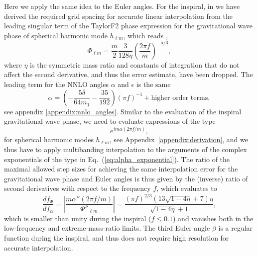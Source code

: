 \documentclass[%
aps,
prd,
amssymb,
amsmath,
amsfonts,
eqsecnum,
showpacs,
nofootinbib,
floatfix,
twocolumn,
twoside,
a4paper,
superscriptaddress
]{revtex4-1}
\begin{document}
Here we apply the same idea to the Euler angles. For the inspiral, in \cite{Garcia-Quiros:2020qlt} we have derived the required grid spacing for accurate linear interpolation from  
the leading singular term of the TaylorF2 phase expression for the gravitational wave phase of spherical harmonic mode $h_{\ell m}$, which reads
\cite{Buonanno:2009zt},
\begin{equation}
\Phi_{\ell m} = \frac{m}{2} \frac{3}{128 \eta} \left(\frac{2\pi f}{m}\right)^{-5/3},
\end{equation}
where $\eta$  is the symmetric mass ratio and constants of integration that do not affect the second derivative, and thus the error estimate, have been dropped. 
The leading term for the NNLO angles $\alpha$ and $\epsilon$ is the same
\begin{equation}
    \alpha  = \left(-\frac{5 \delta }{64 m_1}-\frac{35}{192}\right) (\pi f)^{-1} + \mbox{higher order terms},
\end{equation}
see appendix \ref{appendix:nnlo_angles}.
Similar to the evaluation of the inspiral gravitational wave phase, we need to 
evaluate expressions of the type
\begin{equation}\label{eq:alpha_exponential}
e^{i m \alpha(2\pi f/m)},
\end{equation}
for spherical harmonic modes $h_{\ell m}$,
see Appendix~\ref{appendix:derivation}, and we thus have to apply multibanding interpolation to the arguments of the complex exponentials of the type in Eq.~(\ref{eq:alpha_exponential}).
The ratio of the maximal allowed step sizes for achieving the same interpolation error for the gravitational wave phase and Euler angles is thus given by the (inverse) ratio of second derivatives with respect to the frequency $f$, which evaluates to
\begin{equation}
 \frac{df_{\Phi}}{df_{\alpha}} = \left\vert \frac{m \alpha''(2\pi f/m)}{\Phi''_{\ell m} } \right\vert = \frac{(\pi f)^{2/3} \left(13 \sqrt{1-4 \eta }+7\right) \eta
   }{\sqrt{1-4 \eta }+1},
\end{equation}
which is smaller than unity during the inspiral ($f \leq 0.1$) and vanishes both in the low-frequency and extreme-mass-ratio limits. The third Euler angle $\beta$ is a regular function during the inspiral, and thus does not require high resolution for accurate interpolation.
\end{document}
